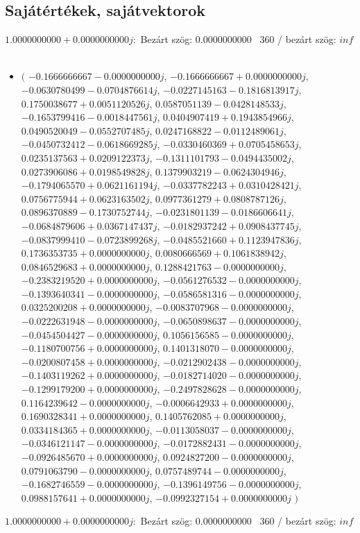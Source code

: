 \documentclass[14pt,a4paper]{article}
\begin{document}
\subsection{Sajátértékek, sajátvektorok}
$1.0000000000+0.0000000000j$:\
Bezárt szög: $0.0000000000$ \
360 / bezárt szög: $inf$\
\begin{itemize}
\item
$\big($
$-0.1666666667-0.0000000000j$, $-0.1666666667+0.0000000000j$, $-0.0630780499-0.0704876614j$, $-0.0227145163-0.1816813917j$, $0.1750038677+0.0051120526j$, $0.0587051139-0.0428148533j$, $-0.1653799416-0.0018447561j$, $0.0404907419+0.1943854966j$, $0.0490520049-0.0552707485j$, $0.0247168822-0.0112489061j$, $-0.0450732412-0.0618669285j$, $-0.0330460369+0.0705458653j$, $0.0235137563+0.0209122373j$, $-0.1311101793-0.0494435002j$, $0.0273906086+0.0198549828j$, $0.1379903219-0.0624304946j$, $-0.1794065570+0.0621161194j$, $-0.0337782243+0.0310428421j$, $0.0756775944+0.0623163502j$, $0.0977361279+0.0808787126j$, $0.0896370889-0.1730752744j$, $-0.0231801139-0.0186606641j$, $-0.0684879606+0.0367147437j$, $-0.0182937242+0.0908437745j$, $-0.0837999410-0.0723899268j$, $-0.0485521660+0.1123947836j$, $0.1736353735+0.0000000000j$, $0.0080666569+0.1061838942j$, $0.0846529683+0.0000000000j$, $0.1288421763-0.0000000000j$, $-0.2383219520+0.0000000000j$, $-0.0561276532-0.0000000000j$, $-0.1393640341-0.0000000000j$, $-0.0586581316-0.0000000000j$, $0.0325200208+0.0000000000j$, $-0.0083707968-0.0000000000j$, $-0.0222631948-0.0000000000j$, $-0.0650898637-0.0000000000j$, $-0.0454504427-0.0000000000j$, $0.1056156585-0.0000000000j$, $-0.1180700756+0.0000000000j$, $0.1401318070-0.0000000000j$, $-0.0200807458+0.0000000000j$, $-0.0212902438-0.0000000000j$, $-0.1403119262+0.0000000000j$, $-0.0182714020-0.0000000000j$, $-0.1299179200+0.0000000000j$, $-0.2497828628-0.0000000000j$, $0.1164239642-0.0000000000j$, $-0.0006642933+0.0000000000j$, $0.1690328341+0.0000000000j$, $0.1405762085+0.0000000000j$, $0.0334184365+0.0000000000j$, $-0.0113058037-0.0000000000j$, $-0.0346121147-0.0000000000j$, $-0.0172882431-0.0000000000j$, $-0.0926485670+0.0000000000j$, $0.0924827200-0.0000000000j$, $0.0791063790-0.0000000000j$, $0.0757489744-0.0000000000j$, $-0.1682746559-0.0000000000j$, $-0.1396149756-0.0000000000j$, $0.0988157641+0.0000000000j$, $-0.0992327154+0.0000000000j$
$\big)$
\end{itemize}
$1.0000000000+0.0000000000j$:\
Bezárt szög: $0.0000000000$ \
360 / bezárt szög: $inf$\
\end{document}
